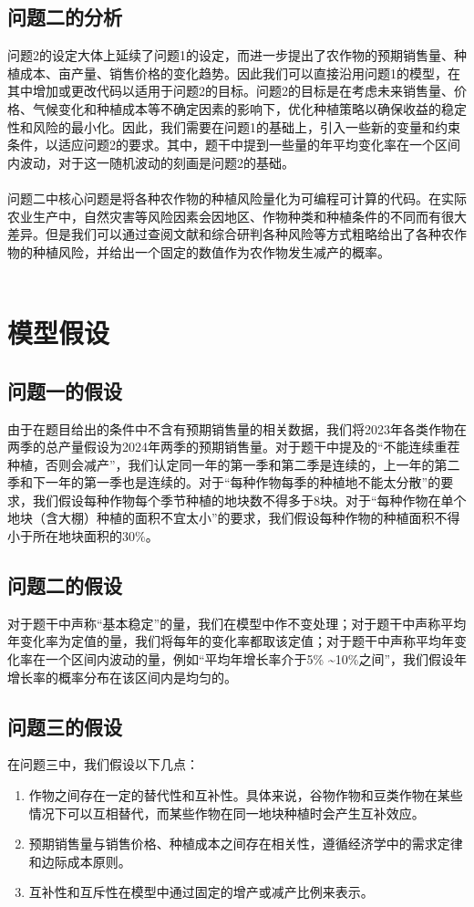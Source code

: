 \documentclass{cumcmthesis}
\begin{document}
\subsection{问题二的分析}
问题2的设定大体上延续了问题1的设定，而进一步提出了农作物的预期销售量、种植成本、亩产量、销售价格的变化趋势。因此我们可以直接沿用问题1的模型，在其中增加或更改代码以适用于问题2的目标。问题2的目标是在考虑未来销售量、价格、气候变化和种植成本等不确定因素的影响下，优化种植策略以确保收益的稳定性和风险的最小化。因此，我们需要在问题1的基础上，引入一些新的变量和约束条件，以适应问题2的要求。其中，题干中提到一些量的年平均变化率在一个区间内波动，对于这一随机波动的刻画是问题2的基础。\\\\
问题二中核心问题是将各种农作物的种植风险量化为可编程可计算的代码。在实际农业生产中，自然灾害等风险因素会因地区、作物种类和种植条件的不同而有很大差异。但是我们可以通过查阅文献和综合研判各种风险等方式粗略给出了各种农作物的种植风险，并给出一个固定的数值作为农作物发生减产的概率。\\\\

\section{模型假设}
\subsection{问题一的假设}
由于在题目给出的条件中不含有预期销售量的相关数据，我们将2023年各类作物在两季的总产量假设为2024年两季的预期销售量。对于题干中提及的“不能连续重茬种植，否则会减产”，我们认定同一年的第一季和第二季是连续的，上一年的第二季和下一年的第一季也是连续的。对于“每种作物每季的种植地不能太分散”的要求，我们假设每种作物每个季节种植的地块数不得多于8块。对于“每种作物在单个地块（含大棚）种植的面积不宜太小”的要求，我们假设每种作物的种植面积不得小于所在地块面积的30\%。
\subsection{问题二的假设}
对于题干中声称“基本稳定”的量，我们在模型中作不变处理；对于题干中声称平均年变化率为定值的量，我们将每年的变化率都取该定值；对于题干中声称平均年变化率在一个区间内波动的量，例如“平均年增长率介于5\% \textasciitilde 10\%之间”，我们假设年增长率的概率分布在该区间内是均匀的。
\subsection{问题三的假设}
在问题三中，我们假设以下几点：
\begin{enumerate}
    \item 作物之间存在一定的替代性和互补性。具体来说，谷物作物和豆类作物在某些情况下可以互相替代，而某些作物在同一地块种植时会产生互补效应。
    \item 预期销售量与销售价格、种植成本之间存在相关性，遵循经济学中的需求定律和边际成本原则。
    \item 互补性和互斥性在模型中通过固定的增产或减产比例来表示。
\end{enumerate}
\end{document}
